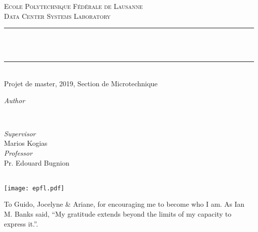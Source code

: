 \makeatletter
{}
\begin{titlepage}
	\newcommand{\HRule}{\rule{\linewidth}{0.5mm}}

	\center


	\textsc{\LARGE Ecole Polytechnique Fédérale de Lausanne}\\[1cm]

	\textsc{\Large Data Center Systems Laboratory}\\[0.5cm]


	\HRule\\[0.4cm]

	{\huge\bfseries \@title}\\[0.4cm]

    \HRule\\[0.4cm]
    {\large{}Projet de master, 2019, Section de Microtechnique}\\[1.5cm]


    \begin{minipage}[t]{0.4\textwidth}
		\begin{flushleft}
			\large
			\textit{Author}\\
			\@author
		\end{flushleft}
	\end{minipage}
	~
    \begin{minipage}[t]{0.4\textwidth}
		\begin{flushright}
			\large
			\textit{Supervisor}\\
			Marios Kogias\\
			\textit{Professor}\\
            Pr. Edouard Bugnion
		\end{flushright}
	\end{minipage}

    \vfill

    {\large\@date}\\

	\texttt{[image: epfl.pdf]}
\end{titlepage}
\restoregeometry
\cleardoublepage

\hspace{0pt}
\vfill

\begin{dedication}
    To Guido, Jocelyne \& Ariane, for encouraging me to become who I am.
    As Ian M. Banks said, ``My gratitude extends beyond the limits of my capacity to express it.''.
\end{dedication}
\vfill

\clearpage
